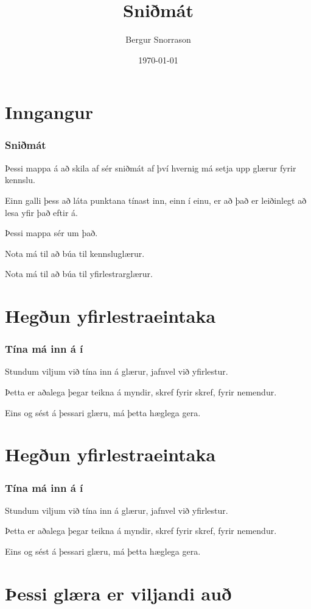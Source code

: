 \title{Sniðmát}
\author{Bergur Snorrason}
\date{\today}



\frame{\titlepage}

\section{Inngangur}
{
	\frametitle{Sniðmát}
	{
		\item<1-> Þessi mappa á að skila af sér sniðmát af því hvernig má setja upp glærur fyrir kennslu.
		\item<2-> Einn galli þess að láta punktana tínast inn, einn í einu, er að það er leiðinlegt að lesa yfir það eftir á.
		\item<3-> Þessi mappa sér um það.
		\item<4-> Nota má  til að búa til kennsluglærur.
		\item<5-> Nota má  til að búa til yfirlestrarglærur.
	}
}

\section{Hegðun yfirlestraeintaka}
{
	\frametitle{Tína má inn á í }
	{
		\item<all:1-> Stundum viljum við tína inn á glærur, jafnvel við yfirlestur.
		\item<all:2-> Þetta er aðalega þegar teikna á myndir, skref fyrir skref, fyrir nemendur.
		\item<all:3-> Eins og sést á þessari glæru, má þetta hæglega gera.
	}
}

\section{Hegðun yfirlestraeintaka}
{
	\frametitle{Tína má inn á í }
	{
		\item<all:1-> Stundum viljum við tína inn á glærur, jafnvel við yfirlestur.
		\item<all:2-> Þetta er aðalega þegar teikna á myndir, skref fyrir skref, fyrir nemendur.
		\item<all:3-> Eins og sést á þessari glæru, má þetta hæglega gera.
	}
}

\section{Þessi glæra er viljandi auð}
{
}



